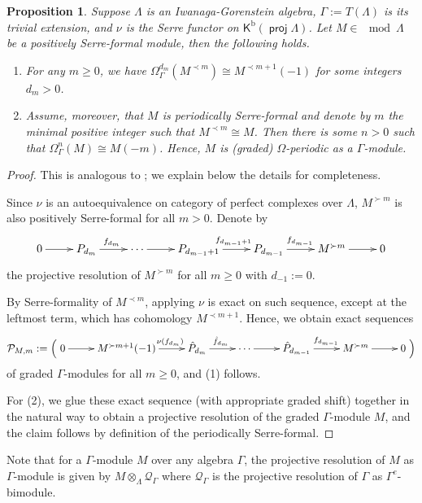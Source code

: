 \documentclass[a4paper,reqno,11pt]{amsart}
\newtheorem{proposition}[theorem]{Proposition}
\theoremstyle{definition}
\newcommand{\KKK}{\mathsf{K}}
\DeclareMathOperator{\proj}{\mathsf{proj}}
\newcommand{\Kb}{\KKK^{\mathrm{b}}}
\numberwithin{equation}{section}
\begin{document}
\begin{proposition}\label{nuformal}
Suppose $\Lambda$ is an Iwanaga-Gorenstein algebra, $\Gamma:=T(\Lambda)$ is its trivial extension, and $\nu$ is the Serre functor on $\Kb(\proj\Lambda)$.
Let $M\in\mod\Lambda$ be a positively Serre-formal module, then the following holds.
\begin{enumerate}
\item For any $m\geq 0$, we have $\Omega_{\Gamma}^{d_m}(M^{\prec m})\cong M^{\prec m+1}(-1)$ for some integers $d_m>0$.

\item Assume, moreover, that $M$ is periodically Serre-formal and denote by $m$ the minimal positive integer such that $M^{\prec m}\cong M$.  Then there is some $n>0$ such that $\Omega_{\Gamma}^n(M)\cong M(-m)$.  Hence, $M$ is (graded) $\Omega$-periodic as a $\Gamma$-module.
\end{enumerate}
\end{proposition}
\begin{proof}
This is analogous to \cite[Lemma 5.5]{CIM}; we explain below the details for completeness.

Since $\nu$ is an autoequivalence on category of perfect complexes over $\Lambda$, $M^{\succ m}$ is also positively Serre-formal for all $m>0$.
Denote by 
\[
\xymatrix{
 0 \ar[r]& P_{d_m} \ar[r]^{f_{d_m}} & \cdots\ar[r]& P_{d_{m-1}+1} \ar[r]^{f_{d_{m-1}+1}} & P_{d_{m-1}} \ar[r]^{f_{d_{m-1}}} & M^{\succ m}\ar[r] & 0
}
\]
the projective resolution of $M^{\succ m}$ for all $m\geq 0$ with $d_{-1}:=0$.

By Serre-formality of $M^{\prec m}$, applying $\nu$ is exact on such sequence, except at the leftmost term, which has cohomology $M^{\prec m+1}$.  Hence, we obtain exact sequences
\[
\mathcal{P}_{M,m}:=\Big(\xymatrix{
 0 \ar[r]& M^{\succ m+1}(-1)\ar[r]^{\phantom{abcd}\nu(f_{d_m})} & \hat{P}_{d_m} \ar[r]^{\hat{f}_{d_m}} & \cdots \ar[r]& \hat{P}_{d_{m-1}} \ar[r]^{f_{d_{m-1}}} & M^{\succ m}\ar[r] & 0
}\Big)
\]
of graded $\Gamma$-modules for all $m\geq 0$, and (1) follows.

For (2), we glue these exact sequence (with appropriate graded shift) together in the natural way to obtain a projective resolution of the graded $\Gamma$-module $M$, and the claim follows by definition of the periodically Serre-formal.
\end{proof}

Note that for a $\Gamma$-module $M$ over any algebra $\Gamma$, the projective resolution of $M$ as $\Gamma$-module is given by $M\otimes_\Lambda\mathcal{Q}_\Gamma$ where $\mathcal{Q}_\Gamma$ is the projective resolution of $\Gamma$ as $\Gamma^e$-bimodule.
\end{document}

